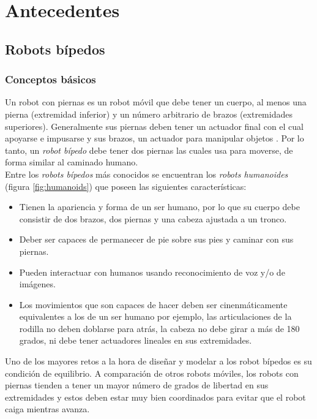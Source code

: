 \chapter{Antecedentes}
	\section{Robots bípedos}
		\subsection*{Conceptos básicos}
Un robot con piernas es un robot móvil que debe tener un cuerpo, al menos una pierna (extremidad inferior) y un número arbitrario de brazos (extremidades superiores). Generalmente sus piernas deben tener un actuador final con el cual apoyarse e impusarse  y sus brazos, un actuador para manipular objetos \citep{siciliano2016springer}. Por lo tanto, un \textit{robot bípedo} debe tener dos piernas las cuales usa para moverse, de forma similar al caminado humano.
\\

Entre los \textit{robots bípedos} más conocidos se encuentran los \textit{robots humanoides} (figura \ref{fig:humanoids}) que poseen las siguientes características:

\begin{itemize}
\item Tienen la apariencia y forma de un ser humano, por lo que su cuerpo debe consistir de dos brazos, dos piernas y una cabeza ajustada a un tronco.
\item Deber ser capaces de permanecer de pie sobre sus pies y caminar con sus piernas.
\item Pueden interactuar con humanos usando reconocimiento de voz y/o de imágenes.
\item Los movimientos que son capaces de hacer deben ser cinenmáticamente equivalentes a los de un ser humano por ejemplo, las articulaciones de la rodilla no deben doblarse para atrás, la cabeza no debe girar a más de 180 grados, ni debe tener actuadores lineales en sus extremidades.
\end{itemize}

Uno de los mayores retos a la hora de diseñar y modelar a los robot bípedos es su condición de equilibrio. A comparación de otros robots móviles, los robots con piernas tienden a tener un mayor número de grados de libertad en sus extremidades y estos deben estar muy bien coordinados para evitar que el  robot caiga mientras avanza.
\\
